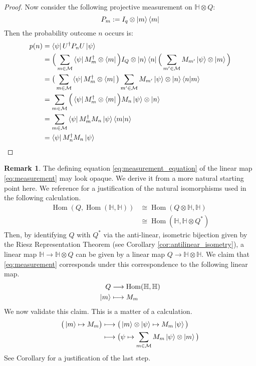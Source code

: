 \documentclass[12pt]{article}
\theoremstyle{plain}
\theoremstyle{definition}
\newtheorem{remark}[thm]{Remark}
\newcommand{\bb}[1]{\mathbb{#1}}
\newcommand{\call}[1]{\mathcal{#1}}
\newcommand{\lto}{\longrightarrow}
\begin{document}
\begin{proof}
		Now consider the following projective measurement on $\bb{H} \otimes Q$:
		\begin{equation}
			P_m := I_q \otimes \ket{m}\bra{m}
		\end{equation}
		Then the probability outcome $n$ occurs is:
		\begin{align*}
			p(n) &= \bra{\psi}U^\dagger P_n U \ket{\psi}\\
			&= \Big(\sum_{m \in \call{M}}\bra{\psi}M_m^\dagger \otimes \bra{m}\Big) I_Q \otimes \ket{n}\bra{n}\Big(\sum_{m' \in \call{M}}M_{m'}\ket{\psi}\otimes\ket{m}\Big)\\
			&= \big(\sum_{m \in \call{M}}\bra{\psi}M_m^\dagger \otimes \bra{m}\big)\sum_{m'\in\call{M}}M_{m'}\ket{\psi}\otimes\ket{n}\bra{n}\ket{m}\\
			&=\sum_{m \in \call{M}}\Big(\bra{\psi}M_m^\dagger \otimes \bra{m}\Big) M_n \ket{\psi}\otimes \ket{n}\\
			&=\sum_{m \in \call{M}}\bra{\psi}M_m^\dagger M_n\ket{\psi}\bra{m}\ket{n}\\
			&=\bra{\psi}M_n^\dagger M_n \ket{\psi}
		\end{align*}
	\end{proof}
	\begin{remark}
		The defining equation \eqref{eq:measurement_equation} of the linear map \eqref{eq:measurement} may look opaque. We derive it from a more natural starting point here. We reference \cite[\S1.2]{CommutativeAlgebra} for a justification of the natural isomorphisms used in the following calculation.
		\begin{align}
			\operatorname{Hom}(Q, \operatorname{Hom}(\bb{H}, \bb{H})) &\cong \operatorname{Hom}(Q \otimes \bb{H}, \bb{H})\\
			&\cong\operatorname{Hom}(\bb{H}, \bb{H} \otimes Q^\ast)
		\end{align}
		Then, by identifying $Q$ with $Q^\ast$ via the anti-linear, isometric bijection given by the Riesz Representation Theorem (see Corollary \ref{cor:antilinear_isometry}), a linear map $\bb{H} \lto \bb{H} \otimes Q$ can be given by a linear map $Q \lto \bb{H} \otimes \bb{H}$. We claim that \eqref{eq:measurement} corresponds under this correspondence to the following linear map.
		\begin{align}
			Q &\lto \operatorname{Hom}(\bb{H}, \bb{H})\\
			\ket{m} &\longmapsto M_m
		\end{align}
		We now validate this claim. This is a matter of a calculation.
		\begin{align}
			\big(\ket{m} \mapsto M_m\big) &\longmapsto \big(\ket{m} \otimes \ket{\psi} \mapsto M_m\ket{\psi}\big)\\
			& \longmapsto \big(\psi \mapsto \sum_{m \in \call{M}} M_m\ket{\psi} \otimes \ket{m}\big)
		\end{align}
		See Corollary \cite[1.2.6]{CommutativeAlgebra} for a justification of the last step.
	\end{remark}
	
\end{document}
